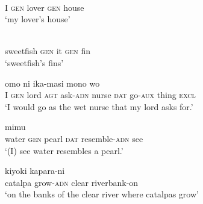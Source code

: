 \documentclass[output=paper]{LSP/langsci}
\begin{document}
\begin{exe}
\ex%
\label{14-ya-ex:2}
\begin{xlist}
\ex
\label{14-ya-ex:2a}
\\ %
I \textsc{gen} lover \textsc{gen} house\\
\glt ‘my lover’s house’

\ex
\label{14-ya-ex:2b}
\\ %
sweetfish \textsc{gen} it \textsc{gen} fin\\
\glt ‘sweetfish’s fins’
\end{xlist}
\end{exe}


\begin{exe}
\ex%
\label{14-ya-ex:3}
\begin{xlist}
\ex
\label{14-ya-ex:3a}
 omo ni ika-masi mono wo\\ %
I \textsc{gen} lord \textsc{agt} ask-\textsc{adn} nurse \textsc{dat} go-\textsc{aux} thing \textsc{excl}\\
\glt ‘I would go as the wet nurse that my lord asks for.’

\ex
\label{14-ya-ex:3b}
 mimu\\ %
water \textsc{gen} pearl \textsc{dat} resemble-\textsc{adn} see\\
\glt ‘(I) see water resembles a pearl.’

\ex
\label{14-ya-ex:3c}
 kiyoki kapara-ni\\ %
catalpa {} grow-\textsc{adn} clear riverbank-on\\
\glt ‘on the banks of the clear river where catalpas grow’
\end{xlist}
\end{exe}
\end{document}
